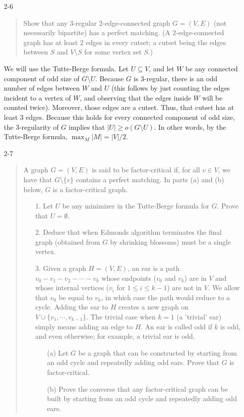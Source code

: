 \documentclass[12pt]{article}
\begin{document}
\begin{enumerate}
\item[2-6]

\begin{quote}
Show that any 3-regular 2-edge-connected graph $G = (V,E)$ (not necessarily bipartite) has a perfect matching. (A 2-edge-connected graph has at least 2 edges in every cutset; a cutset being the edges between $S$ and $V\setminus S$ for some vertex set $S$.)
\end{quote}
We will use the Tutte-Berge formula. Let $U \subseteq V$, and
let $W$ be any connected component of odd size of $G \setminus U$.
Because $G$ is 3-regular, there is an odd number of edges between
$W$ and $U$ (this follows by just counting the edges incident to a
vertex of $W$, and observing that the edges inside $W$ will be counted
twice). Moreover, those edges are a cutset. Thus, that cutset
has at least 3 edges. Because this holds for every connected
component of odd size, the 3-regularity of $G$ implies that
$|U| \geq o(G \setminus U)$. In other words, by the
Tutte-Berge formula, $\max_M |M| = |V|/2$.


\item[2-7] %

\begin{quote}
A graph $G = (V, E)$ is said to be factor-critical if, for all $v \in V$, we have that $G \setminus \{v\}$ contains a perfect matching. In parts (a) and (b) below, $G$ is a factor-critical
graph.
\begin{itemize}
\item[1.] Let $U$ be any minimizer in the Tutte-Berge formula for $G$. Prove that $U = \emptyset$. %
\item[2.] Deduce that when Edmonds algorithm terminates the final graph (obtained from $G$ by shrinking blossoms) must be a single vertex.
\item[3.] Given a graph $H = (V, E)$, an ear is a path $v_0 - v_1 - v_2 - \cdots - v_k$ whose endpoints ($v_0$ and $v_k$) are in $V$ and whose internal vertices ($v_i$ for $1 \leq i \leq k - 1$) are not in $V$. We allow that $v_0$ be equal to $v_k$, in which case the path would reduce to a cycle. Adding the ear to $H$ creates a new graph on $V \cup \{v_1,\cdots, v_{k-1}\}$. The trivial case when $k = 1$ (a ’trivial’ ear) simply means adding an edge to $H$. An ear is called odd if $k$ is odd, and
even otherwise; for example, a trivial ear is odd.
\begin{itemize}
\item[(a)] Let $G$ be a graph that can be constructed by starting from an odd cycle and repeatedly adding odd ears. Prove that $G$ is factor-critical.
\item[(b)] Prove the converse that any factor-critical graph can be built by starting from an odd cycle and repeatedly adding odd ears.
\end{itemize}
\end{itemize}
\end{quote}


\end{enumerate}
\end{document}

